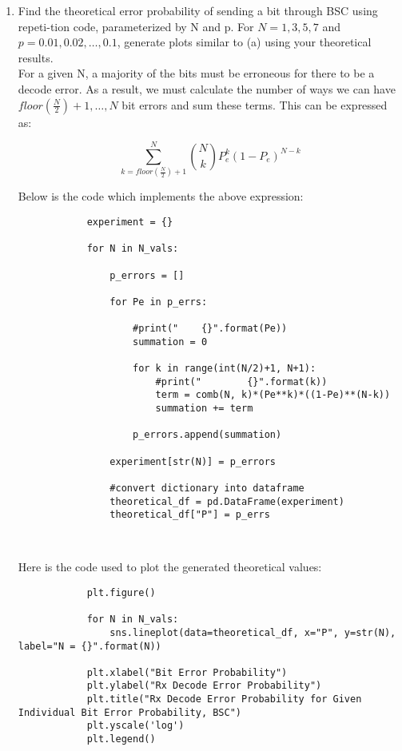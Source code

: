 \documentclass[]{article}
\begin{document}
\begin{enumerate}
\begin{enumerate}
		
		\item  Find the theoretical error probability of sending a bit through BSC using repeti-tion code, parameterized by N and p. For $ N = 1,3,5, 7 $ and $ p={0.01,0.02,\ldots,0.1} $, generate plots similar to (a) using your theoretical results.\\
		
		For a given N, a majority of the bits must be erroneous for there to be a decode error. As a result, we must calculate the number of ways we can have $floor(\frac{N}{2})+1, \ldots, N$ bit errors and sum these terms. This can be expressed as:
		
		\[
		\sum_{k=floor(\frac{N}{2})+1}^{N}{N \choose k}P_e^k(1-P_e)^{N-k}
		\]
		
		Below is the code which implements the above expression:
		
		\begin{lstlisting}
			experiment = {}
			
			for N in N_vals:

				p_errors = []
			
				for Pe in p_errs:
			
					#print("    {}".format(Pe))
					summation = 0
			
					for k in range(int(N/2)+1, N+1):
						#print("        {}".format(k))
						term = comb(N, k)*(Pe**k)*((1-Pe)**(N-k))
						summation += term
			
					p_errors.append(summation)
			
				experiment[str(N)] = p_errors
				
				#convert dictionary into dataframe
				theoretical_df = pd.DataFrame(experiment)
				theoretical_df["P"] = p_errs
				
				
		\end{lstlisting}
	
		Here is the code used to plot the generated theoretical values:\newline
		
		\begin{lstlisting}
			plt.figure()
			
			for N in N_vals:
				sns.lineplot(data=theoretical_df, x="P", y=str(N), label="N = {}".format(N))
			
			plt.xlabel("Bit Error Probability")
			plt.ylabel("Rx Decode Error Probability")
			plt.title("Rx Decode Error Probability for Given Individual Bit Error Probability, BSC")
			plt.yscale('log')
			plt.legend()
		\end{lstlisting}
	

\end{enumerate}
\end{enumerate}
\end{document}
